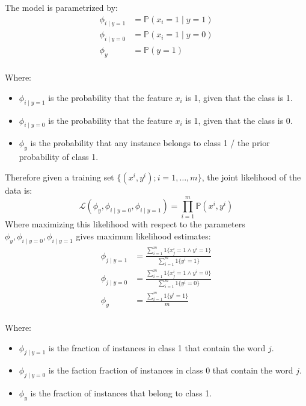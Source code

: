 \documentclass[12pt letter]{report}
\begin{document}
The model is parametrized by:
\begin{align*}
  \phi_{i  \mid y = 1} & = \mathbb{P} \left( x_i = 1  \mid y = 1 \right) \\
  \phi_{i  \mid y = 0} & = \mathbb{P} \left( x_i = 1  \mid y = 0 \right) \\
  \phi_y               & = \mathbb{P} \left( y = 1 \right)               \\
\end{align*}

Where:
\begin{itemize}
  \item $\phi_{i  \mid y = 1} $ is the probability that the feature $x_i$ is 1, given that the class is 1.
  \item $\phi_{i  \mid y = 0} $ is the probability that the feature $x_i$ is 1, given that the class is 0.
  \item $\phi_y $ is the probability that any instance belongs to class 1 / the prior probability of class 1.
\end{itemize}

Therefore given a training set $\{ \left( x^{i}, y^{i} \right); i = 1, \ldots, m \} $, the joint likelihood of the data
is:
\[
  \mathcal{L} \left( \phi_y, \phi_{i \mid y = 0}, \phi_{i  \mid y = 1} \right) = \prod_{i=1}^{m}  \mathbb{P} \left(
  x^{i}, y^{i} \right)
\]
Where maximizing this likelihood with respect to the parameters $\phi_y, \phi_{i \mid y = 0}, \phi_{i  \mid y = 1} $
gives maximum likelihood estimates:
\begin{align*}
  \phi_{j  \mid y = 1}  & = \frac{\displaystyle\sum_{i=1}^{m} 1 \{x_j^{i} = 1 \wedge y^{i} = 1\}
  }{\displaystyle\sum_{i=1}^{m}1 \{y^{i} = 1\} }                                                 \\
  \phi_{j  \mid  y = 0} & = \frac{\displaystyle\sum_{i=1}^{m} 1 \{x^{i}_j = 1 \wedge y^{i} = 0\}
  }{\displaystyle\sum_{i=1}^{m}1 \{y^{i} = 0\} }                                                 \\
  \phi_y                & = \frac{\displaystyle\sum_{i=1}^{m} 1 \{y^{i} = 1\} }{m}               \\
\end{align*}

Where:
\begin{itemize}
  \item $\phi_{j  \mid y = 1}$ is the fraction of instances in class 1 that contain the word $j$.
  \item  $\phi_{j  \mid y = 0}$ is the faction fraction of instances in class 0 that contain the word $j$.
  \item  $\phi_y$ is the fraction of instances that belong to class 1.
\end{itemize}
\end{document}
